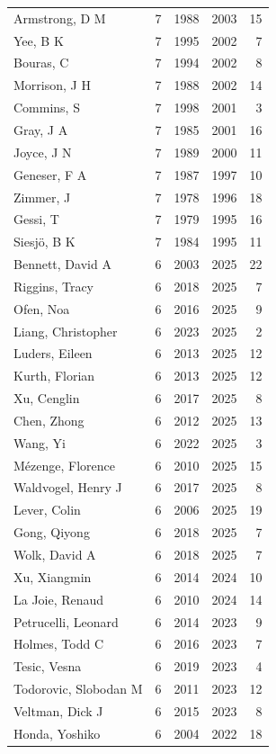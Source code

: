 \documentclass{../latex/analysis_report}
\begin{document}
\begin{longtable}{lrrrr}
Armstrong, D M & 7 & 1988 & 2003 & 15 \\
Yee, B K & 7 & 1995 & 2002 & 7 \\
Bouras, C & 7 & 1994 & 2002 & 8 \\
Morrison, J H & 7 & 1988 & 2002 & 14 \\
Commins, S & 7 & 1998 & 2001 & 3 \\
Gray, J A & 7 & 1985 & 2001 & 16 \\
Joyce, J N & 7 & 1989 & 2000 & 11 \\
Geneser, F A & 7 & 1987 & 1997 & 10 \\
Zimmer, J & 7 & 1978 & 1996 & 18 \\
Gessi, T & 7 & 1979 & 1995 & 16 \\
Siesjö, B K & 7 & 1984 & 1995 & 11 \\
Bennett, David A & 6 & 2003 & 2025 & 22 \\
Riggins, Tracy & 6 & 2018 & 2025 & 7 \\
Ofen, Noa & 6 & 2016 & 2025 & 9 \\
Liang, Christopher & 6 & 2023 & 2025 & 2 \\
Luders, Eileen & 6 & 2013 & 2025 & 12 \\
Kurth, Florian & 6 & 2013 & 2025 & 12 \\
Xu, Cenglin & 6 & 2017 & 2025 & 8 \\
Chen, Zhong & 6 & 2012 & 2025 & 13 \\
Wang, Yi & 6 & 2022 & 2025 & 3 \\
Mézenge, Florence & 6 & 2010 & 2025 & 15 \\
Waldvogel, Henry J & 6 & 2017 & 2025 & 8 \\
Lever, Colin & 6 & 2006 & 2025 & 19 \\
Gong, Qiyong & 6 & 2018 & 2025 & 7 \\
Wolk, David A & 6 & 2018 & 2025 & 7 \\
Xu, Xiangmin & 6 & 2014 & 2024 & 10 \\
La Joie, Renaud & 6 & 2010 & 2024 & 14 \\
Petrucelli, Leonard & 6 & 2014 & 2023 & 9 \\
Holmes, Todd C & 6 & 2016 & 2023 & 7 \\
Tesic, Vesna & 6 & 2019 & 2023 & 4 \\
Todorovic, Slobodan M & 6 & 2011 & 2023 & 12 \\
Veltman, Dick J & 6 & 2015 & 2023 & 8 \\
Honda, Yoshiko & 6 & 2004 & 2022 & 18 \\

\end{longtable}
\end{document}
